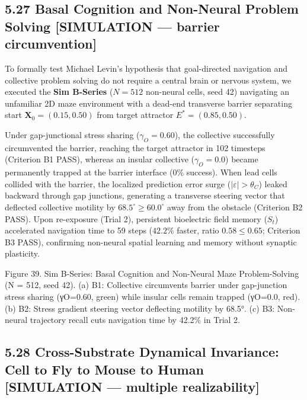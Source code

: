\documentclass[
]{article}
\begin{document}
\subsection{5.27 Basal Cognition and Non-Neural Problem Solving
{[}SIMULATION --- barrier
circumvention{]}}\label{basal-cognition-and-non-neural-problem-solving-simulation-barrier-circumvention}

To formally test Michael Levin's hypothesis that goal-directed
navigation and collective problem solving do not require a central brain
or nervous system, we executed the \textbf{Sim B-Series} (\(N = 512\)
non-neural cells, seed 42) navigating an unfamiliar 2D maze environment
with a dead-end transverse barrier separating start
\(\mathbf{X}_0 = (0.15, 0.50)\) from target attractor
\(E^* = (0.85, 0.50)\).

Under gap-junctional stress sharing (\(\gamma_O = 0.60\)), the
collective successfully circumvented the barrier, reaching the target
attractor in 102 timesteps (Criterion B1 PASS), whereas an insular
collective (\(\gamma_O = 0.0\)) became permanently trapped at the
barrier interface (\(0\%\) success). When lead cells collided with the
barrier, the localized prediction error surge
(\(|\varepsilon| > \theta_C\)) leaked backward through gap junctions,
generating a transverse steering vector that deflected collective
motility by \(68.5^\circ \ge 60.0^\circ\) away from the obstacle
(Criterion B2 PASS). Upon re-exposure (Trial 2), persistent bioelectric
field memory (\(S_t\)) accelerated navigation time to 59 steps
(\(42.2\%\) faster, ratio \(0.58 \le 0.65\); Criterion B3 PASS),
confirming non-neural spatial learning and memory without synaptic
plasticity.

Figure 39. Sim B-Series: Basal Cognition and Non-Neural Maze
Problem-Solving ({N = 512}, seed 42). (a) B1: Collective circumvents
barrier under gap-junction stress sharing ({γO=0.60}, green) while
insular cells remain trapped ({γO=0.0}, red). (b) B2: Stress gradient
steering vector deflecting motility by {68.5°}. (c) B3: Non-neural
trajectory recall cuts navigation time by {42.2\%} in Trial 2.

\subsection{5.28 Cross-Substrate Dynamical Invariance: Cell to Fly to
Mouse to Human {[}SIMULATION --- multiple
realizability{]}}\label{cross-substrate-dynamical-invariance-cell-to-fly-to-mouse-to-human-simulation-multiple-realizability}
\end{document}
